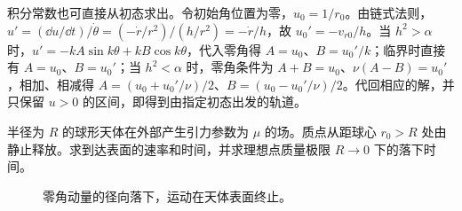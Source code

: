 \begin{solution}
积分常数也可直接从初态求出。令初始角位置为零，$u_0=1/r_0$。由链式法则，$u'=(\dd u/\dd t)/\dot\theta=(-\dot r/r^2)/(h/r^2)=-\dot r/h$，故 $u_0'=-v_{r0}/h$。当 $h^2>\alpha$ 时，$u'=-kA\sin k\theta+kB\cos k\theta$，代入零角得 $A=u_0$、$B=u_0'/k$；临界时直接有 $A=u_0$、$B=u_0'$；当 $h^2<\alpha$ 时，零角条件为 $A+B=u_0$、$\nu(A-B)=u_0'$，相加、相减得 $A=(u_0+u_0'/\nu)/2$、$B=(u_0-u_0'/\nu)/2$。代回相应的解，并只保留 $u>0$ 的区间，即得到由指定初态出发的轨道。

\end{solution}



\begin{example}[从静止开始的径向落下]\label{sup8:problem-example-4}\label{sup8:ex:d8-e4}
半径为 $R$ 的球形天体在外部产生引力参数为 $\mu$ 的场。质点从距球心 $r_0>R$ 处由静止释放。求到达表面的速率和时间，并求理想点质量极限 $R\to0$ 下的落下时间。
\end{example}
\begin{figure}[H]\centering
{}
\caption{零角动量的径向落下，运动在天体表面终止。}\label{sup8:fig:d8-e4-q}
\end{figure}

